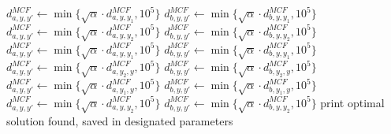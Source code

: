 \documentclass[../thesis.tex]{subfiles}
\begin{document}
\begin{algorithm}[H]
\begin{algorithmic}

    \STATE $d^{MCF}_{a,y,y'}\gets\min\{\sqrt\alpha\cdot d^{MCF}_{a,y,y_1},10^5\}$
    \STATE $d^{MCF}_{b,y,y'}\gets\min\{\sqrt\alpha\cdot d^{MCF}_{b,y,y_1},10^5\}$    
    \STATE $d^{MCF}_{a,y,y'}\gets\min\{\sqrt\alpha\cdot d^{MCF}_{a,y,y_2},10^5\}$
    \STATE $d^{MCF}_{b,y,y'}\gets\min\{\sqrt\alpha\cdot d^{MCF}_{b,y,y_2},10^5\}$
    \ENDFOR
    \STATE $d^{MCF}_{a,y,y'}\gets\min\{\sqrt\alpha\cdot d^{MCF}_{a,y,y_1},10^5\}$
    \STATE $d^{MCF}_{b,y,y'}\gets\min\{\sqrt\alpha\cdot d^{MCF}_{b,y,y_1},10^5\}$    
    \STATE $d^{MCF}_{a,y,y'}\gets\min\{\sqrt\alpha\cdot d^{MCF}_{a,y_2,y},10^5\}$
    \STATE $d^{MCF}_{b,y,y'}\gets\min\{\sqrt\alpha\cdot d^{MCF}_{b,y_2,y},10^5\}$
    \ENDFOR
    \STATE $d^{MCF}_{a,y,y'}\gets\min\{\sqrt\alpha\cdot d^{MCF}_{a,y_1,y},10^5\}$
    \STATE $d^{MCF}_{b,y,y'}\gets\min\{\sqrt\alpha\cdot d^{MCF}_{b,y_1,y},10^5\}$    
    \STATE $d^{MCF}_{a,y,y'}\gets\min\{\sqrt\alpha\cdot d^{MCF}_{a,y,y_2},10^5\}$
    \STATE $d^{MCF}_{b,y,y'}\gets\min\{\sqrt\alpha\cdot d^{MCF}_{b,y,y_2},10^5\}$
    \ENDFOR
    \ENDFOR
    \ENDIF
    \ENDIF
    \ENDWHILE
    \STATE print optimal solution found, saved in designated parameters
    \end{algorithmic}
    \end{algorithm}
\end{document}
